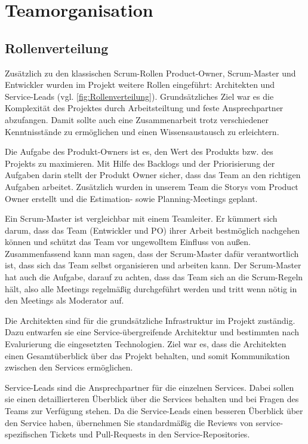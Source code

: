 
\chapter{Teamorganisation}

\section{Rollenverteilung}
    Zusätzlich zu den klassischen Scrum-Rollen Product-Owner, Scrum-Master und Entwickler 
    wurden im Projekt weitere Rollen eingeführt: Architekten und Service-Leads (vgl. \ref*{fig:Rollenverteilung}). 
    Grundsätzliches Ziel war es die Komplexität des Projektes durch Arbeitsteiltung und feste Ansprechpartner abzufangen.
    Damit sollte auch eine Zusammenarbeit trotz verschiedener Kenntnisstände zu ermöglichen und einen Wissensaustausch zu erleichtern.   

    Die Aufgabe des Produkt-Owners ist es, den Wert des Produkts bzw. des Projekts
    zu maximieren. Mit Hilfe des Backlogs und der Priorisierung der Aufgaben darin stellt der Produkt Owner
    sicher, dass das Team an den richtigen Aufgaben arbeitet.
    Zusätzlich wurden in unserem Team die Storys vom Product Owner erstellt und die Estimation- sowie Planning-Meetings geplant.

    Ein Scrum-Master ist vergleichbar mit einem Teamleiter. Er kümmert sich darum, dass
    das Team (Entwickler und PO) ihrer Arbeit bestmöglich nachgehen können und schützt
    das Team vor ungewolltem Einfluss von außen. Zusammenfassend kann
    man sagen, dass der Scrum-Master dafür verantwortlich ist, dass sich das Team selbst
    organisieren und arbeiten kann. Der Scrum-Master hat auch die Aufgabe, darauf zu achten, dass das Team sich an die
    Scrum-Regeln hält, also alle Meetings regelmäßig durchgeführt werden und tritt wenn nötig in den Meetings als Moderator auf.

    Die Architekten sind für die grundsätzliche Infrastruktur im Projekt zuständig. 
    Dazu entwarfen sie eine Service-übergreifende Architektur und bestimmten nach Evalurierung die eingesetzten Technologien.
    Ziel war es, dass die Architekten einen Gesamtüberblick über das Projekt behalten, 
    und somit Kommunikation zwischen den Services ermöglichen.
     
    
    Service-Leads sind die Ansprechpartner für die einzelnen Services. Dabei sollen sie einen detaillierteren Überblick über die Services behalten 
    und bei Fragen des Teams zur Verfügung stehen. 
    Da die Service-Leads einen besseren Überblick über den Service haben, 
    übernehmen Sie standardmäßig die Reviews von service-spezifischen Tickets und Pull-Requests in den Service-Repositories.


